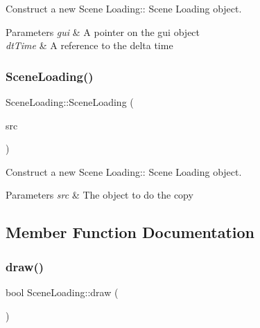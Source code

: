 Construct a new Scene Loading\+:\+: Scene Loading object. 


\begin{DoxyParams}{Parameters}
{\em gui} & A pointer on the gui object \\
\hline
{\em dt\+Time} & A reference to the delta time \\
\hline
\end{DoxyParams}
\mbox{\label{class_scene_loading_a7ea2382387ab3fd9a9d9b9a605f28915}} 
\subsubsection{\texorpdfstring{Scene\+Loading()}{SceneLoading()}\hspace{0.1cm}{\footnotesize\ttfamily [2/2]}}
{\footnotesize\ttfamily Scene\+Loading\+::\+Scene\+Loading (\begin{DoxyParamCaption}\item[{\hyperlink{class_scene_loading}{Scene\+Loading} const \&}]{src }\end{DoxyParamCaption})}



Construct a new Scene Loading\+:\+: Scene Loading object. 


\begin{DoxyParams}{Parameters}
{\em src} & The object to do the copy \\
\hline
\end{DoxyParams}


\subsection{Member Function Documentation}
\mbox{\label{class_scene_loading_ae51a1b4d4f738847d50036c174364f9e}} 
\subsubsection{\texorpdfstring{draw()}{draw()}}
{\footnotesize\ttfamily bool Scene\+Loading\+::draw (\begin{DoxyParamCaption}{ }\end{DoxyParamCaption})\hspace{0.3cm}{\ttfamily [virtual]}}



